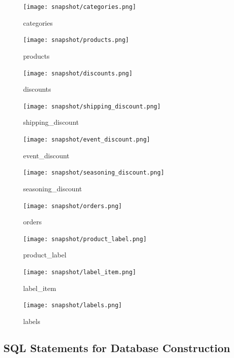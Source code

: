 \documentclass[a4paper, 12pt]{article}
\begin{document}
\begin{figure}[hp]
    \centerline{\texttt{[image: snapshot/categories.png]}}
    \caption{categories}
\end{figure}

\begin{figure}[hp]
    \centerline{\texttt{[image: snapshot/products.png]}}
    \caption{products}
\end{figure}

\begin{figure}[hp]
    \centerline{\texttt{[image: snapshot/discounts.png]}}
    \caption{discounts}
\end{figure}

\begin{figure}[hp]
    \centerline{\texttt{[image: snapshot/shipping\_discount.png]}}
    \caption{shipping_discount}
\end{figure}

\begin{figure}[hp]
    \centerline{\texttt{[image: snapshot/event\_discount.png]}}
    \caption{event_discount}
\end{figure}

\begin{figure}[hp]
    \centerline{\texttt{[image: snapshot/seasoning\_discount.png]}}
    \caption{seasoning_discount}
\end{figure}

\begin{figure}[hp]
    \centerline{\texttt{[image: snapshot/orders.png]}}
    \caption{orders}
\end{figure}

\begin{figure}[hp]
    \centerline{\texttt{[image: snapshot/product\_label.png]}}
    \caption{product_label}
\end{figure}

\begin{figure}[hp]
    \centerline{\texttt{[image: snapshot/label\_item.png]}}
    \caption{label_item}
\end{figure}

\clearpage

\begin{figure}[h!]
    \centerline{\texttt{[image: snapshot/labels.png]}}
    \caption{labels}
\end{figure}

\clearpage

\subsection{SQL Statements for Database Construction}
\end{document}
